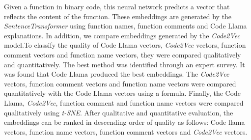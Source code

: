 \documentclass[12pt,letterpaper,ngerman]{article}
\begin{document}
Given a function in binary code, this neural network
predicts a vector that reflects the content of the function.
These embeddings are generated by the \textit{SentenceTransformer}
\cite{reimers-2019-sentence-bert}
using function names, function comments and Code Llama 
\cite{rozière2024codellamaopenfoundation}
explanations.
In addition, we compare embeddings generated by the \textit{Code2Vec}
\cite{code2vec}
model.To classify the quality of Code Llama vectors,
\textit{Code2Vec} vectors, function comment vectors 
and function name vectors, they were compared qualitatively
and quantitatively.
The best method was identified through an expert survey.  
It was found that Code Llama produced the best embeddings. 
The \textit{Code2Vec} vectors, function comment vectors and
function name vectors were compared quantitatively with the
Code Llama vectors using a formula. 
Finally, the Code Llama, \textit{Code2Vec},  function comment 
and function name vectors were 
compared qualitatively using \textit{t-SNE}. 
After qualitative and quantitative evaluation, the embeddings can 
be ranked in descending order of quality as follows: 
Code llama vectors, function name vectors, function comment vectors 
and \textit{Code2Vec} vectors.
\newpage
\tableofcontents
\newpage

\setcounter{page}{1}
\pagestyle{fancy}
\fancyhf{}
\fancyhead[R]{\thepage}
\renewcommand{\headrulewidth}{0pt} %
\newtheorem{definition}{Definition}
\end{document}
